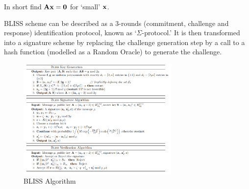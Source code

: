 \documentclass[a4paper,10pt,twocolumn]{article}
\begin{document}
In short find \( {\bf A}{\bf x}={\bf 0} \) for `small' \( {\bf x} \).

BLISS scheme can be described as a 3-rounds (commitment, challenge and response) identification protocol, known 
as  `\( \Sigma \)-protocol.' 
It is then transformed into a signature scheme by replacing the challenge generation step by a call to a hash function (modelled as a Random Oracle)
to generate the challenge.
	
\begin{figure}[ht]
	\begin{center}
	\includegraphics[width=80mm]{bliss.png}
	  \caption{BLISS Algorithm}
	\label{fig:bliss}
	\end{center}
 \end{figure}
\end{document}
